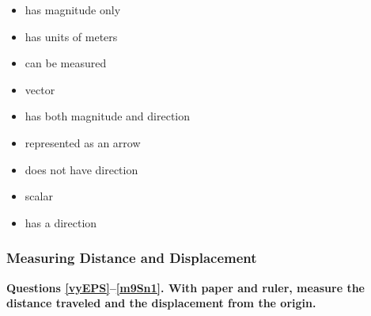 \documentclass[]{exam}
\begin{document}
\begin{questions}
\begin{EnvUplevel}
{\begin{minipage}{5cm}
\begin{itemize}[itemsep=0pt]
    \item has magnitude only
    \item has units of meters
    \item can be measured
    \item vector
    \item has both magnitude and direction
    \item represented as an arrow
    \item does not have direction
    \item scalar
    \item has a direction
\end{itemize}
\end{minipage}
}

\end{EnvUplevel}


\end{questions}

\clearpage





\subsubsection{Measuring Distance and Displacement}   

\textbf{Questions \ref{vyEPS}--\ref{m9Sn1}. With paper and ruler, measure the distance traveled and the displacement from the origin.}      



\clearpage
\end{document}
